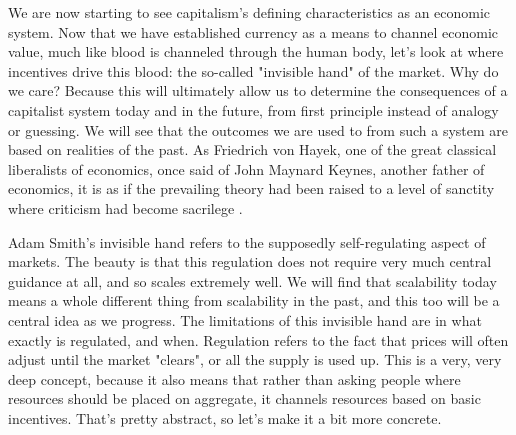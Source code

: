 \documentclass[12pt]{memoir}
\begin{document}
			We are now starting to see capitalism's defining characteristics as an economic system. Now that we have established currency as a means to channel economic value, much like blood is channeled 
			through the human body, let's look at where incentives drive this blood: the so-called "invisible hand" of the market. Why do we care? Because this will ultimately allow us to determine the consequences 
			of a capitalist system today and in the future, from first principle instead of analogy or guessing. We will see that the outcomes we are used to from such a system are based on realities of the past. 
			As Friedrich von Hayek, one of the great classical liberalists of economics, once said of John Maynard Keynes, another father of economics, it is as if the prevailing theory had been raised to a level of 
			sanctity where criticism had become sacrilege \cite{HayekOnKeynes1}.\
			
			Adam Smith's invisible hand refers to the supposedly self-regulating aspect of markets. The beauty is that this regulation does not require very much central guidance at all, and so scales extremely well. We will 
			find that scalability today means a whole different thing from scalability in the past, and this too will be a central idea as we progress. The limitations of this invisible hand are in what exactly 
			is regulated, and when. Regulation refers to the fact that prices will often adjust until the market "clears", or all the supply is used up. This is a very, very deep concept, because it also means that rather than 
			asking people where resources should be placed on aggregate, it channels resources based on basic incentives. That's pretty abstract, so let's make it a bit more concrete.\
			
\end{document}
